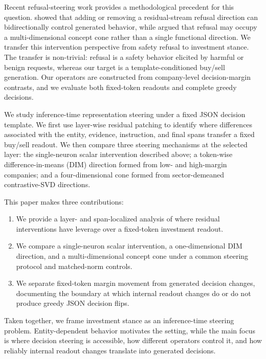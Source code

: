 \documentclass[11pt]{article}
\begin{document}
Recent refusal-steering work provides a methodological precedent for this question. \citet{arditi2024refusallanguagemodelsmediated}
showed that adding or removing a residual-stream refusal direction can bidirectionally control
generated behavior, while \citet{wollschläger2026geometryrefusallargelanguage} argued that refusal may
occupy a multi-dimensional concept cone rather than a single functional direction. We transfer this
intervention perspective from safety refusal to investment stance. The transfer is non-trivial:
refusal is a safety behavior elicited by harmful or benign requests, whereas our target is a
template-conditioned buy/sell generation. Our operators are constructed from company-level
decision-margin contrasts, and we evaluate both fixed-token readouts and complete greedy decisions.

We study inference-time representation steering under a fixed JSON decision template. We first use
layer-wise residual patching to identify where differences associated with the entity, evidence,
instruction, and final spans transfer a fixed buy/sell readout. We then compare three steering
mechanisms at the selected layer: the single-neuron scalar intervention described above; a token-wise
difference-in-means (DIM) direction formed from low- and high-margin companies; and a four-dimensional
cone formed from sector-demeaned contrastive-SVD directions.

This paper makes three contributions:

\begin{enumerate}
    \item We provide a layer- and span-localized analysis of where residual interventions have
    leverage over a fixed-token investment readout.
    \item We compare a single-neuron scalar intervention, a one-dimensional DIM direction, and a
    multi-dimensional concept cone under a common steering protocol and matched-norm controls.
    \item We separate fixed-token margin movement from generated decision changes, documenting the
    boundary at which internal readout changes do or do not produce greedy JSON decision flips.
\end{enumerate}

Taken together, we frame investment stance as an inference-time steering problem. Entity-dependent
behavior motivates the setting, while the main focus is where decision steering is accessible, how
different operators control it, and how reliably internal readout changes translate into generated
decisions.
\end{document}
